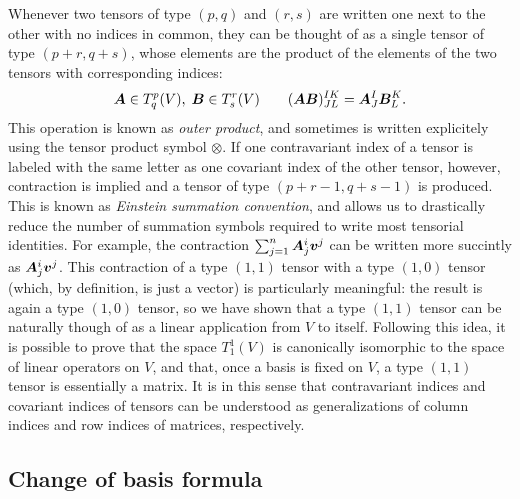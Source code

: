 Whenever two tensors of type $(p,q)$ and $(r,s)$ are written
one next to the other with no indices in common, they can be thought
of as a single tensor of type $(p+r,q+s)$, whose elements are
the product of the elements of the two tensors with corresponding indices:
\[
\bm{A} \in T^p_q(V), \; \bm{B} \in T^r_s(V) \qquad
(\bm{AB})^{IK}_{JL} = \bm{A}^I_J \bm{B}^K_L.
\]
This operation is known as \emph{outer product}, and sometimes
is written explicitely using the tensor product symbol $\otimes$.
If one contravariant index of a tensor is labeled with the same letter
as one covariant index of the other tensor, however,
contraction is implied and a tensor of type $(p+r-1,q+s-1)$ is produced.
This is known as \emph{Einstein summation convention}, and allows us
to drastically reduce the number of summation symbols required
to write most tensorial identities. For example, the contraction
$\sum_{j=1}^n \bm{A}^i_j \bm{v}^j$
can be written more succintly as $\bm{A}^i_j \bm{v}^j$.
This contraction of a type $(1,1)$ tensor with a type $(1,0)$ tensor
(which, by definition, is just a vector) is particularly meaningful:
the result is again a type $(1,0)$ tensor, so we have shown that a type
$(1,1)$ tensor can be naturally though of as a linear application from $V$
to itself. Following this idea, it is possible to prove that the space
$T^1_1(V)$ is canonically isomorphic to the space of linear operators on $V$,
and that, once a basis is fixed on $V$, a type $(1,1)$ tensor is essentially
a matrix. It is in this sense that contravariant indices and covariant indices
of tensors can be understood as generalizations of column indices
and row indices of matrices, respectively.

\subsection*{Change of basis formula}

